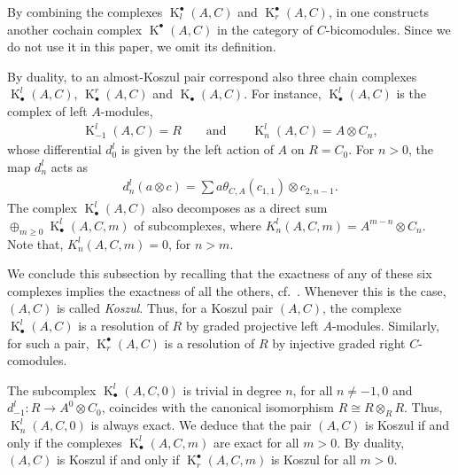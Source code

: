 \documentclass[pdftex]{sigma}
\DeclareMathOperator{\K}{K}
\newcommand\ot{\otimes}
\renewcommand{\^}[1]{\mbox{$^{\left( #1 \right)}$}}
\renewcommand{\_}[1]{\mbox{$_{\left( #1 \right)}$}}
\numberwithin{equation}{section}
\begin{document}
By combining the complexes $\operatorname{K}_l^\bullet(A,C)$ and $\operatorname{K}_r^\bullet(A,C)$, in \cite{jps} one constructs another cochain complex $\operatorname{K}^\bullet(A,C)$ in the category of $C$-bicomodules. Since we do not use it in this paper, we omit its def\/inition.

By duality, to an almost-Koszul pair correspond also three chain complexes $\operatorname{K}^l_\bullet\!(A{,}C)$, $\operatorname{K}^r_\bullet\!(A{,}C)$ and $\operatorname{K}_\bullet(A,C)$. For instance, $\operatorname{K}^l_\bullet(A,C)$ is the complex of left $A$-modules,
\begin{gather*} \operatorname{K}_{-1}^l(A,C)=R \qquad \text{and} \qquad \operatorname{K}^l_n(A,C)=A \ot C_n,\end{gather*}
whose dif\/ferential $d_{0}^l$ is given by the left action of $A$ on $R=C_0$. For $n > 0$, the map $d_n^l$ acts as
\begin{gather*}
	d_{n}^{l}(a\otimes c)=\sum\limits a\theta _{C,A}(c_{1,{1}})\otimes c_{2,{n-1}}.
\end{gather*}
The complex $\operatorname{K}_\bullet^l(A,C)$ also decomposes as a direct sum $\oplus_{m\geq 0}\operatorname{K}^l_\bullet(A,C,m)$ of subcomplexes, where ${K}^l_n(A,C,m)=A^{m-n}\ot C_n$. Note that, ${K}^l_n(A,C,m)=0$, for $n>m$.

We conclude this subsection by recalling that the exactness of any of these six complexes implies the exactness of all the others, cf.\ \cite[Theorem~2.3]{jps}. Whenever this is the case, $(A,C)$ is called \emph{Koszul}. Thus, for a Koszul pair $(A,C)$, the complexe $\operatorname{K}_\bullet^l(A,C)$ is a resolution of $R$ by graded projective left $A$-modules. Similarly, for such a pair, $\operatorname{K}^\bullet_r(A,C)$ is a resolution of $R$ by injective graded right $C$-comodules.

The subcomplex $\K_\bullet^l(A,C,0)$ is trivial in degree $n$, for all $n\neq -1,0$ and $d_{-1}^l\colon R\to A^0\ot C_0$, coincides with the canonical isomorphism $R\cong R\ot_R R$. Thus, $\K_n^l(A,C,0)$ is always exact. We deduce that the pair $(A,C)$ is Koszul if and only if the complexes $\K_\bullet^l(A,C,m)$ are exact for all $m>0$. By duality, $(A,C)$ is Koszul if and only if $\K^\bullet_r(A,C,m)$ is Koszul for all $m>0$.
\end{document}
